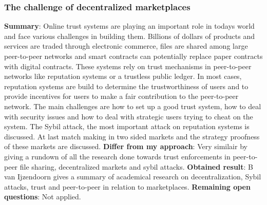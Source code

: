 \subsubsection{The challenge of decentralized marketplaces \cite{challangeDecentralizedMarketplaces}}
\textbf{Summary}: Online trust systems are playing an important role in todays world and face various challenges in building them. Billions of dollars of products and services are traded through electronic commerce, files are shared among large peer-to-peer networks and smart contracts can potentially replace paper contracts with digital contracts. These systems rely on trust mechanisms in peer-to-peer networks like reputation systems or a trustless public ledger. In most cases, reputation systems are build to determine the trustworthiness of users and to provide incentives for users to make a fair contribution to the peer-to-peer network. The main challenges are how to set up a good trust system, how to deal with security issues and how to deal with strategic users trying to cheat on the system. The Sybil attack, the most important attack on reputation systems is discussed. At last match making in two sided markets and the strategy proofness of these markets are discussed.\newline
\textbf{Differ from my approach}: Very similair by giving a rundown of all the research done towards trust enforcements in peer-to-peer file sharing, decentralized markets and sybil attacks. \newline
\textbf{Obtained result}: B van Ijzendoorn gives a summary of academical research on decentralization, Sybil attacks, trust and peer-to-peer in relation to marketplaces. \newline
\textbf{Remaining open questions}: Not applied.\newline


